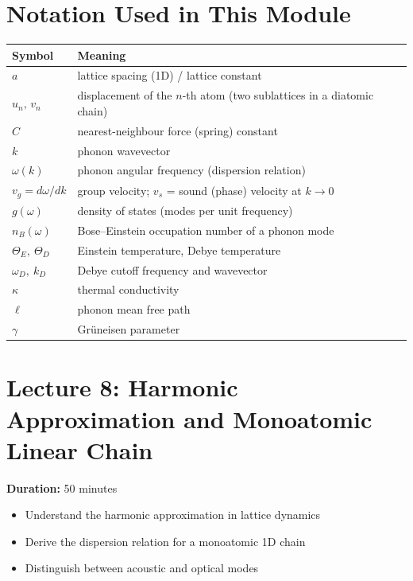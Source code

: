 \documentclass[11pt,a4paper]{article}
\newcommand{\lecheader}[3]{%
  \section{Lecture #1: #2}
  \noindent\textbf{Duration:} #3\par\vspace{4pt}
}
\begin{document}
\tableofcontents
\newpage

\section*{Notation Used in This Module}
\begin{center}
\renewcommand{\arraystretch}{1.25}
\begin{tabular}{@{}ll@{}}
\toprule
\textbf{Symbol} & \textbf{Meaning}\\
\midrule
$a$ & lattice spacing (1D) / lattice constant \\
$u_n,\,v_n$ & displacement of the $n$-th atom (two sublattices in a diatomic chain) \\
$C$ & nearest-neighbour force (spring) constant \\
$k$ & phonon wavevector \\
$\omega(k)$ & phonon angular frequency (dispersion relation) \\
$v_g = d\omega/dk$ & group velocity; $v_s$ = sound (phase) velocity at $k\to0$ \\
$g(\omega)$ & density of states (modes per unit frequency) \\
$n_B(\omega)$ & Bose--Einstein occupation number of a phonon mode \\
$\Theta_E,\ \Theta_D$ & Einstein temperature, Debye temperature \\
$\omega_D,\ k_D$ & Debye cutoff frequency and wavevector \\
$\kappa$ & thermal conductivity \\
$\ell$ & phonon mean free path \\
$\gamma$ & Gr\"uneisen parameter \\
\bottomrule
\end{tabular}
\end{center}

\newpage
\lecheader{8}{Harmonic Approximation and Monoatomic Linear Chain}{50 minutes}

\begin{keybox}
\begin{itemize}
\item Understand the harmonic approximation in lattice dynamics
\item Derive the dispersion relation for a monoatomic 1D chain
\item Distinguish between acoustic and optical modes
\end{itemize}
\end{keybox}
\end{document}

